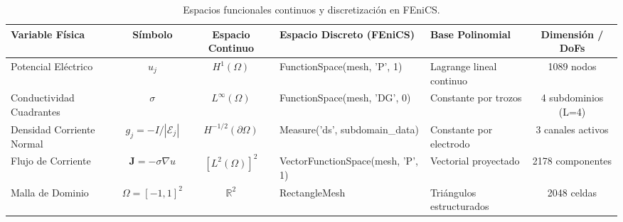 \begin{table}[htbp]
  \centering
  \caption{Espacios funcionales continuos y discretización en FEniCS.}
  \label{tab:functional_spaces}
  \begin{tabular}{p{3.2cm} c c p{4.2cm} p{2.8cm} c}
    \hline\hline
    \textbf{Variable Física} & \textbf{Símbolo} & \textbf{Espacio Continuo} & \textbf{Espacio Discreto (FEniCS)} & \textbf{Base Polinomial} & \textbf{Dimensión / DoFs} \\ \hline
    Potencial Eléctrico & $u_j$ & $H^1(\Omega)$ & FunctionSpace(mesh, 'P', 1) & Lagrange lineal continuo & 1089 nodos \\ \hline
    Conductividad Cuadrantes & $\sigma$ & $L^\infty(\Omega)$ & FunctionSpace(mesh, 'DG', 0) & Constante por trozos & 4 subdominios (L=4) \\ \hline
    Densidad Corriente Normal & $g_j = -I/|\mathcal{E}_j|$ & $H^{-1/2}(\partial\Omega)$ & Measure('ds', subdomain_data) & Constante por electrodo & 3 canales activos \\ \hline
    Flujo de Corriente & $\mathbf{J} = -\sigma \nabla u$ & $[L^2(\Omega)]^2$ & VectorFunctionSpace(mesh, 'P', 1) & Vectorial proyectado & 2178 componentes \\ \hline
    Malla de Dominio & $\Omega = [-1,1]^2$ & $\mathbb{R}^2$ & RectangleMesh & Triángulos estructurados & 2048 celdas \\ \hline
    \hline\hline
  \end{tabular}
\end{table}
